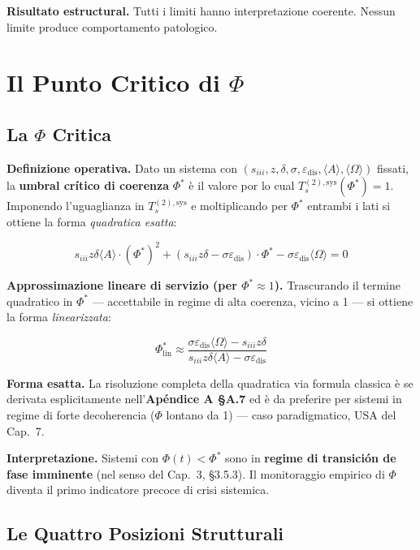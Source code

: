 \Proved{} \textbf{Risultato estructural.} Tutti i limiti hanno
interpretazione coerente. Nessun limite produce comportamento
patologico.



\section{Il Punto Critico di $\Phi$}\label{il-punto-critico-di-ux3c6}

\subsection{La $\Phi$ Critica}\label{la-ux3c6-critica}

\Hypoth{} \textbf{Definizione operativa.} Dato un sistema con
\((s_{iii}, z, \delta, \sigma, \varepsilon_{\text{dis}}, \langle A\rangle, \langle\Omega\rangle)\)
fissati, la \textbf{umbral crítico di coerenza} \(\Phi^*\) è il valore
por lo cual \(T_s^{(2),\text{sys}}(\Phi^*) = 1\). Imponendo l'uguaglianza in
\(T_s^{(2),\text{sys}}\) e moltiplicando per \(\Phi^*\) entrambi i lati
si ottiene la forma \emph{quadratica esatta}:

\[
s_{iii} z \delta \langle A\rangle \cdot (\Phi^*)^2 + (s_{iii} z \delta - \sigma \varepsilon_{\text{dis}}) \cdot \Phi^* - \sigma \varepsilon_{\text{dis}} \langle\Omega\rangle = 0
\]

\Hypoth{} \textbf{Approssimazione lineare di servizio (per
\(\Phi^* \approx 1\)).} Trascurando il termine quadratico in \(\Phi^*\)
--- accettabile in regime di alta coerenza, vicino a 1 --- si ottiene la
forma \emph{linearizzata}:

\[
\Phi^*_{\text{lin}} \approx \frac{\sigma \varepsilon_{\text{dis}} \langle\Omega\rangle - s_{iii} z \delta}{s_{iii} z \delta \langle A\rangle - \sigma \varepsilon_{\text{dis}}}
\]

\Proved{} \textbf{Forma esatta.} La risoluzione completa della
quadratica via formula classica è se derivata esplicitamente
nell'\textbf{Apéndice A \S{}A.7} ed è da preferire per sistemi in regime
di forte decoherencia (\(\Phi\) lontano da 1) --- caso paradigmatico, USA
del Cap.~7.

\Hypoth{} \textbf{Interpretazione.} Sistemi con \(\Phi(t) < \Phi^*\)
sono in \textbf{regime di transición de fase imminente} (nel senso del
Cap.~3, \S{}3.5.3). Il monitoraggio empirico di \(\Phi\) diventa il primo
indicatore precoce di crisi sistemica.

\subsection{Le Quattro Posizioni
Strutturali}\label{le-quattro-posizioni-strutturali}

